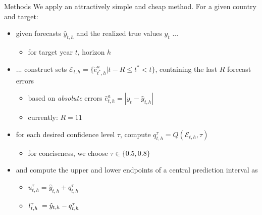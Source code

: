 \documentclass[en]{sdqbeamer}
\begin{document}
\begin{frame}{Methods}
We apply an attractively simple and cheap method. For a given country and target:
\begin{itemize}
    \item given forecasts $\hat{y}_{t, h}$ and the realized true values $y_{t}$ ...
    \begin{itemize}
        \item for target year $t$, horizon $h$
    \end{itemize}
    \item ... construct sets $\mathcal{E}_{t, h} = \{\hat{e}^{a}_{t^*, h}  | t-R \leq t^* < t \}$, containing the last $R$ forecast errors
    \begin{itemize}
        \item based on \textit{absolute} errors $\hat{e}^{a}_{t,h} = |y_{t} - \hat{y}_{t, h}| $
        \item currently: $R=11$
    \end{itemize}
    \item for each desired confidence level $\tau$, compute $q^{\tau}_{t, h} =  Q\left(\mathcal{E}_{t, h}, \tau \right)$
    \begin{itemize}
    \item  for conciseness, we choose $\tau  \in \{0.5, 0.8\}$
    \end{itemize}
    \item and compute the upper and lower endpoints of a central prediction interval as 
    \begin{itemize}
        \item $u^{\tau}_{t,h} = \hat{y}_{t, h} + q^{\tau}_{t, h}$ 
        \item $l^{\tau}_{t,h} \hspace{1mm} = \hat{y}_{t, h} - q^{\tau}_{t, h}$
    \end{itemize}
    
\end{itemize}
\end{frame}
\end{document}

